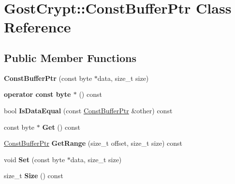 \hypertarget{class_gost_crypt_1_1_const_buffer_ptr}{}\section{Gost\+Crypt\+:\+:Const\+Buffer\+Ptr Class Reference}
\label{class_gost_crypt_1_1_const_buffer_ptr}
\subsection*{Public Member Functions}
\begin{DoxyCompactItemize}
\item 
\mbox{\label{class_gost_crypt_1_1_const_buffer_ptr_a6741e5da8c46ce3ea6a665c3631fa1e8}} 
{\bfseries Const\+Buffer\+Ptr} (const byte $\ast$data, size\+\_\+t size)
\item 
\mbox{\label{class_gost_crypt_1_1_const_buffer_ptr_a8ff5db2cf1d23dd46a31c9cacf2916c3}} 
{\bfseries operator const byte $\ast$} () const
\item 
\mbox{\label{class_gost_crypt_1_1_const_buffer_ptr_a71848d9a9d875ea508328df3f86edbcf}} 
bool {\bfseries Is\+Data\+Equal} (const \hyperlink{class_gost_crypt_1_1_const_buffer_ptr}{Const\+Buffer\+Ptr} \&other) const
\item 
\mbox{\label{class_gost_crypt_1_1_const_buffer_ptr_a38ca31fb1926ac1429eebdedff255874}} 
const byte $\ast$ {\bfseries Get} () const
\item 
\mbox{\label{class_gost_crypt_1_1_const_buffer_ptr_aa87f1d2f218b223d0c50707cd4d234e6}} 
\hyperlink{class_gost_crypt_1_1_const_buffer_ptr}{Const\+Buffer\+Ptr} {\bfseries Get\+Range} (size\+\_\+t offset, size\+\_\+t size) const
\item 
\mbox{\label{class_gost_crypt_1_1_const_buffer_ptr_a60be70a7104395292ece78c6e575e39b}} 
void {\bfseries Set} (const byte $\ast$data, size\+\_\+t size)
\item 
\mbox{\label{class_gost_crypt_1_1_const_buffer_ptr_aee7ae8d66735ced4bb9efedeb27238af}} 
size\+\_\+t {\bfseries Size} () const
\end{DoxyCompactItemize}
